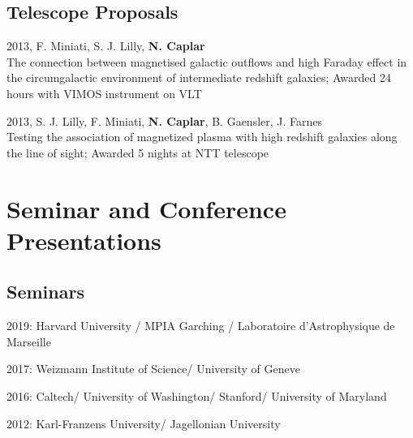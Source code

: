 \documentclass[11pt,letterpaper]{article}
\renewenvironment{itemize}{
  \begin{list}{}{
    \setlength{\leftmargin}{1.5em}
    \setlength{\itemsep}{0.10em}
    \setlength{\parskip}{0pt}
    \setlength{\parsep}{0.10em}
  }
}{
  \end{list}
}
\begin{document}
\newpage 


\subsection*{Telescope Proposals}
\begin{itemize}
\item 2013, F. Miniati, S. J. Lilly, \textbf{N. Caplar} \\ The connection between magnetised galactic outflows and high Faraday effect in the circumgalactic environment of intermediate redshift galaxies;  Awarded 24 hours with VIMOS instrument on VLT
\item 2013, S. J. Lilly, F. Miniati,  \textbf{N. Caplar}, B. Gaensler, J. Farnes  \\ Testing the association of magnetized plasma with high redshift galaxies along the line of sight; 
Awarded 5 nights at NTT telescope
\end{itemize}

\section*{Seminar and Conference Presentations}
\subsection*{Seminars}
\begin{itemize}
\item 2019: Harvard University / MPIA Garching / Laboratoire d'Astrophysique de Marseille

\item 2017:  Weizmann Institute of Science/ University of Geneve

\item 2016: Caltech/ University of Washington/ Stanford/ University of Maryland

\item 2012:
Karl-Franzens University/ Jagellonian University
\end{itemize}
\end{document}
